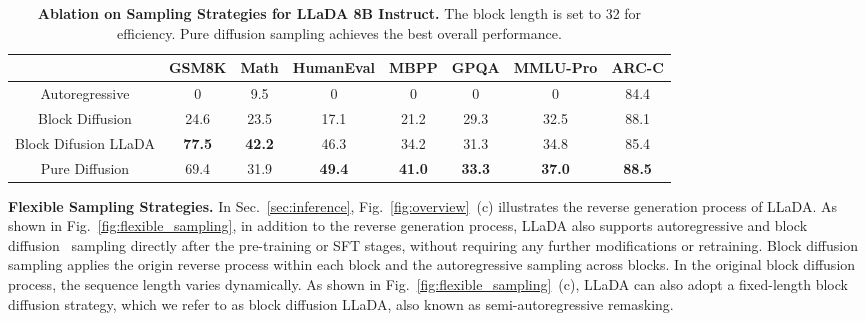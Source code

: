 \documentclass{article}
\begin{document}
\begin{table}[t!]
    \centering 
    \caption{\textbf{Ablation on Sampling Strategies for LLaDA 8B Instruct.} The block length is set to 32 for efficiency. Pure diffusion sampling achieves the best overall performance.} 
    \label{tab:abation_sample_instruct}
    \vspace{0.2cm}
    \begin{adjustbox}{max width=\textwidth}
    \begin{tabular}{c|ccccccc}
    \toprule
    & GSM8K & Math & HumanEval & MBPP & GPQA & MMLU-Pro & ARC-C \\
    \midrule
    Autoregressive & 0 & 9.5 & 0 &0 & 0 & 0 & 84.4\\
    \midrule
    Block Diffusion & 24.6 & 23.5 & 17.1 & 21.2& 29.3 & 32.5 & 88.1\\
    \midrule
    Block Difusion LLaDA & \textbf{77.5} & \textbf{42.2} & 46.3 & 34.2 & 31.3 & 34.8 & 85.4 \\
    \midrule
    Pure Diffusion & 69.4 & 31.9 & \textbf{49.4} & \textbf{41.0} & \textbf{33.3}  & \textbf{37.0} & \textbf{88.5}\\
    \bottomrule
    \end{tabular}
    \end{adjustbox}
\end{table}

\textbf{Flexible Sampling Strategies.} In Sec.~\ref{sec:inference}, Fig.~\ref{fig:overview}~(c) illustrates the reverse generation process of LLaDA. As shown in Fig.~\ref{fig:flexible_sampling}, in addition to the reverse generation process, LLaDA also supports autoregressive and block diffusion~\citep{arriola2025block} sampling directly after the pre-training or SFT stages, without requiring any further modifications or retraining. Block diffusion sampling applies the origin reverse process within each block and the autoregressive sampling across blocks. In the original block diffusion process, the sequence length varies dynamically. As shown in Fig.~\ref{fig:flexible_sampling}~(c), LLaDA can also adopt a fixed-length block diffusion strategy, which we refer to as block diffusion LLaDA, also known as semi-autoregressive remasking.
\end{document}
